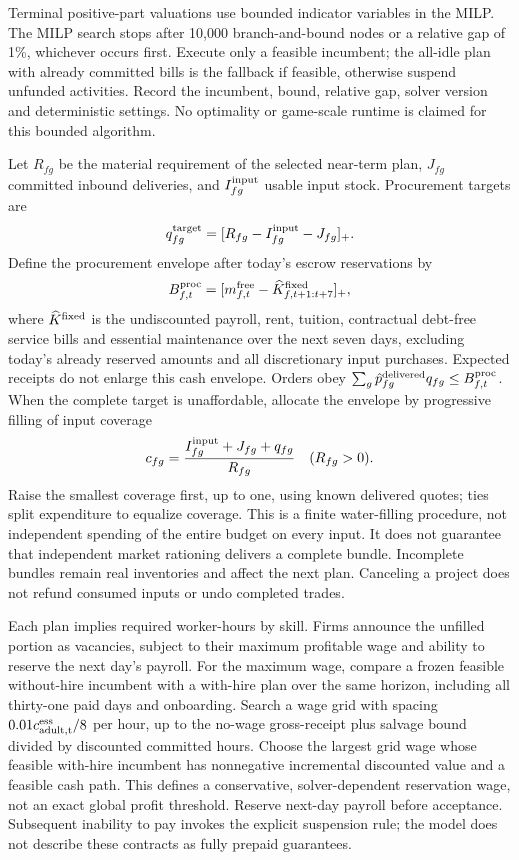 \documentclass[10pt,a4paper,twocolumn]{article}
\begin{document}
Terminal positive-part valuations use bounded indicator variables in the MILP.
The MILP search stops after 10,000 branch-and-bound nodes or a relative
gap of 1\%, whichever occurs first. Execute only a feasible incumbent;
the all-idle plan with already committed bills is the fallback if feasible,
otherwise suspend unfunded activities. Record the incumbent, bound,
relative gap, solver version and deterministic settings. No optimality
or game-scale runtime is claimed for this bounded algorithm.

Let $R_{fg}$ be the material requirement of the selected near-term plan,
$J_{fg}$ committed inbound deliveries, and $I^{\rm input}_{fg}$ usable
input stock. Procurement targets are
\begin{equation}
 q^{\rm target}_{fg}=[R_{fg}-I^{\rm input}_{fg}-J_{fg}]_+.
 \label{eq:procure}
\end{equation}
Define the procurement envelope after today's escrow reservations by
\[
 B^{\rm proc}_{f,t}=
 [m^{\rm free}_{f,t}-\widehat K^{\rm fixed}_{f,t+1:t+7}]_+,
\]
where $\widehat K^{\rm fixed}$ is the undiscounted payroll, rent, tuition,
contractual debt-free service bills and essential maintenance over the
next seven days, excluding today's already reserved amounts and all
discretionary input purchases. Expected receipts do not enlarge this
cash envelope. Orders obey $\sum_g\hat p^{\rm delivered}_{fg}q_{fg}
\leq B^{\rm proc}_{f,t}$.
When the complete target is unaffordable, allocate the envelope by
progressive filling of input coverage
\begin{equation}
 c_{fg}=\frac{I^{\rm input}_{fg}+J_{fg}+q_{fg}}{R_{fg}}
 \quad(R_{fg}>0).
\end{equation}
Raise the smallest coverage first, up to one, using known delivered
quotes; ties split expenditure to equalize coverage. This is a finite
water-filling procedure, not independent spending of the entire budget
on every input. It does not guarantee that independent market rationing
delivers a complete bundle. Incomplete bundles remain real inventories
and affect the next plan. Canceling a project does not refund consumed
inputs or undo completed trades.

Each plan implies required worker-hours by skill. Firms announce the
unfilled portion as vacancies, subject to their maximum profitable wage
and ability to reserve the next day's payroll. For the maximum wage, compare a frozen feasible without-hire incumbent
with a with-hire plan over the same horizon, including all thirty-one
paid days and onboarding. Search a wage grid with spacing
$0.01c^{\rm ess}_{\rm adult,t}/8$ per hour, up to the no-wage gross-receipt
plus salvage bound divided by discounted committed hours. Choose the
largest grid wage whose feasible with-hire incumbent has nonnegative
incremental discounted value and a feasible cash path.
This defines a conservative, solver-dependent reservation wage, not an
exact global profit threshold. Reserve next-day payroll before acceptance.
Subsequent inability to pay invokes the explicit suspension rule; the
model does not describe these contracts as fully prepaid guarantees.
\end{document}
